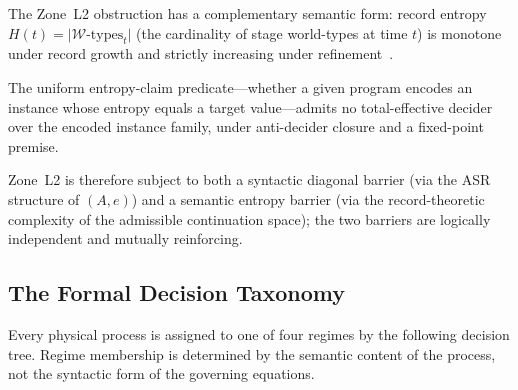 \documentclass[12pt,letterpaper]{article}
\begin{document}
The Zone~L2 obstruction has a complementary semantic form: record entropy
$H(t) = \lvert\mathcal{W}\text{-types}_t\rvert$ (the cardinality of stage
world-types at time $t$) is monotone under record growth and strictly increasing
under refinement~\cite{SpivackNEMS42}.

The uniform entropy-claim predicate---whether a given program encodes an instance
whose entropy equals a target value---admits no total-effective decider over the
encoded instance family, under anti-decider closure and a fixed-point premise.

Zone~L2 is therefore subject to both a syntactic diagonal barrier (via the ASR
structure of $(A,e)$) and a semantic entropy barrier (via the record-theoretic
complexity of the admissible continuation space); the two barriers are logically
independent and mutually reinforcing.

\subsection{The Formal Decision Taxonomy}
\label{sec:taxonomy}

Every physical process is assigned to one of four regimes by the following
decision tree.  Regime membership is determined by the semantic content of the
process, not the syntactic form of the governing equations.
\end{document}
